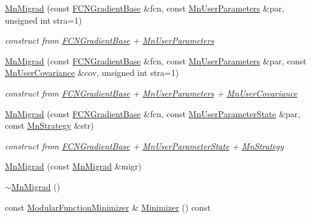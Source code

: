 \begin{DoxyCompactItemize}
\mbox{\hyperlink{classROOT_1_1Minuit2_1_1MnMigrad_ac31c890a07d2e2ca4b52feb5ece6fa3d}{Mn\+Migrad}} (const \mbox{\hyperlink{classROOT_1_1Minuit2_1_1FCNGradientBase}{F\+C\+N\+Gradient\+Base}} \&fcn, const \mbox{\hyperlink{classROOT_1_1Minuit2_1_1MnUserParameters}{Mn\+User\+Parameters}} \&par, unsigned int stra=1)
\begin{DoxyCompactList}\small\item\em construct from \mbox{\hyperlink{classROOT_1_1Minuit2_1_1FCNGradientBase}{F\+C\+N\+Gradient\+Base}} + \mbox{\hyperlink{classROOT_1_1Minuit2_1_1MnUserParameters}{Mn\+User\+Parameters}} \end{DoxyCompactList}\item 
\mbox{\hyperlink{classROOT_1_1Minuit2_1_1MnMigrad_a1c12d5f8210b36cdc555b341f6005c8d}{Mn\+Migrad}} (const \mbox{\hyperlink{classROOT_1_1Minuit2_1_1FCNGradientBase}{F\+C\+N\+Gradient\+Base}} \&fcn, const \mbox{\hyperlink{classROOT_1_1Minuit2_1_1MnUserParameters}{Mn\+User\+Parameters}} \&par, const \mbox{\hyperlink{classROOT_1_1Minuit2_1_1MnUserCovariance}{Mn\+User\+Covariance}} \&cov, unsigned int stra=1)
\begin{DoxyCompactList}\small\item\em construct from \mbox{\hyperlink{classROOT_1_1Minuit2_1_1FCNGradientBase}{F\+C\+N\+Gradient\+Base}} + \mbox{\hyperlink{classROOT_1_1Minuit2_1_1MnUserParameters}{Mn\+User\+Parameters}} + \mbox{\hyperlink{classROOT_1_1Minuit2_1_1MnUserCovariance}{Mn\+User\+Covariance}} \end{DoxyCompactList}\item 
\mbox{\hyperlink{classROOT_1_1Minuit2_1_1MnMigrad_a0397e5984ab0d0163e69315b40a3d520}{Mn\+Migrad}} (const \mbox{\hyperlink{classROOT_1_1Minuit2_1_1FCNGradientBase}{F\+C\+N\+Gradient\+Base}} \&fcn, const \mbox{\hyperlink{classROOT_1_1Minuit2_1_1MnUserParameterState}{Mn\+User\+Parameter\+State}} \&par, const \mbox{\hyperlink{classROOT_1_1Minuit2_1_1MnStrategy}{Mn\+Strategy}} \&str)
\begin{DoxyCompactList}\small\item\em construct from \mbox{\hyperlink{classROOT_1_1Minuit2_1_1FCNGradientBase}{F\+C\+N\+Gradient\+Base}} + \mbox{\hyperlink{classROOT_1_1Minuit2_1_1MnUserParameterState}{Mn\+User\+Parameter\+State}} + \mbox{\hyperlink{classROOT_1_1Minuit2_1_1MnStrategy}{Mn\+Strategy}} \end{DoxyCompactList}\item 
\mbox{\hyperlink{classROOT_1_1Minuit2_1_1MnMigrad_a992fa22c62be692f5cd8f781c73475e0}{Mn\+Migrad}} (const \mbox{\hyperlink{classROOT_1_1Minuit2_1_1MnMigrad}{Mn\+Migrad}} \&migr)
\item 
\mbox{\hyperlink{classROOT_1_1Minuit2_1_1MnMigrad_a7a415c2b0378cf8f4606e53b7d20ae63}{$\sim$\+Mn\+Migrad}} ()
\item 
const \mbox{\hyperlink{classROOT_1_1Minuit2_1_1ModularFunctionMinimizer}{Modular\+Function\+Minimizer}} \& \mbox{\hyperlink{classROOT_1_1Minuit2_1_1MnMigrad_a98fa0ce74bf180a287093ac677e8644c}{Minimizer}} () const
\end{DoxyCompactItemize}

